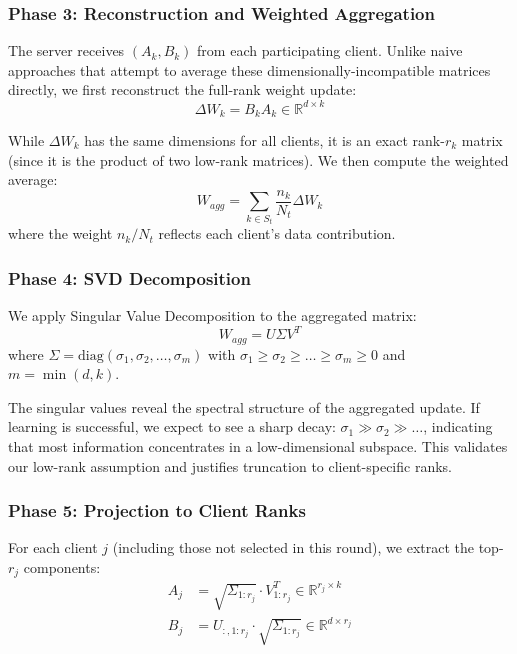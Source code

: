 \documentclass[conference]{IEEEtran}
\begin{document}
\subsubsection{Phase 3: Reconstruction and Weighted Aggregation}

The server receives $(A_k, B_k)$ from each participating client. Unlike naive approaches that attempt to average these dimensionally-incompatible matrices directly, we first reconstruct the full-rank weight update:
\begin{equation}
\Delta W_k = B_k A_k \in \mathbb{R}^{d \times k}
\end{equation}

While $\Delta W_k$ has the same dimensions for all clients, it is an exact rank-$r_k$ matrix (since it is the product of two low-rank matrices). We then compute the weighted average:
\begin{equation}
W_{agg} = \sum_{k \in S_t} \frac{n_k}{N_t} \Delta W_k
\end{equation}
where the weight $n_k/N_t$ reflects each client's data contribution.

\subsubsection{Phase 4: SVD Decomposition}

We apply Singular Value Decomposition to the aggregated matrix:
\begin{equation}
W_{agg} = U \Sigma V^T
\end{equation}
where $\Sigma = \text{diag}(\sigma_1, \sigma_2, \ldots, \sigma_m)$ with $\sigma_1 \geq \sigma_2 \geq \ldots \geq \sigma_m \geq 0$ and $m = \min(d, k)$.

The singular values reveal the spectral structure of the aggregated update. If learning is successful, we expect to see a sharp decay: $\sigma_1 \gg \sigma_2 \gg \ldots$, indicating that most information concentrates in a low-dimensional subspace. This validates our low-rank assumption and justifies truncation to client-specific ranks.

\subsubsection{Phase 5: Projection to Client Ranks}

For each client $j$ (including those not selected in this round), we extract the top-$r_j$ components:
\begin{equation}
\begin{aligned}
A_j &= \sqrt{\Sigma_{1:r_j}} \cdot V^T_{1:r_j} \in \mathbb{R}^{r_j \times k} \\
B_j &= U_{:,1:r_j} \cdot \sqrt{\Sigma_{1:r_j}} \in \mathbb{R}^{d \times r_j}
\end{aligned}
\end{equation}
\end{document}
